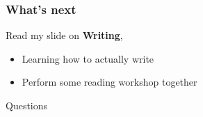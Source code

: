 \documentclass{beamer}
\begin{document}
\begin{frame}
\frametitle{What's next}
Read my slide on \textbf{Writing},
	\begin{itemize}
		\item Learning how to actually write
		\item Perform some reading workshop together
	\end{itemize}
\end{frame}

\begin{frame}
\Huge{\centerline{Questions}}
\end{frame}

%
%
\end{document}
